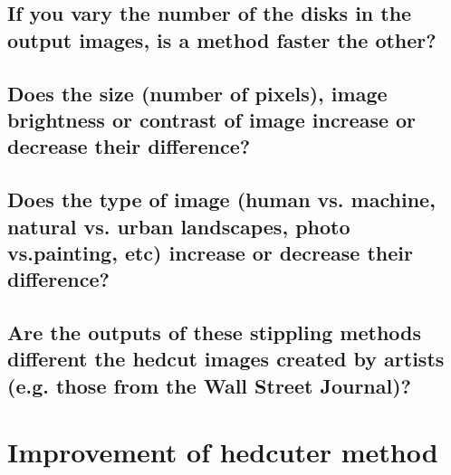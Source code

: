 \documentclass[11pt]{article}
\begin{document}
\subsection{If you vary the number of the disks in the output images, is a method faster the other?}
\subsection{Does the size (number of pixels), image brightness or contrast of image increase or decrease their difference?}
\subsection{Does the type of image (human vs. machine, natural vs. urban landscapes, photo vs.painting, etc) increase or decrease their difference?}
\subsection{Are the outputs of these stippling methods different the hedcut images created by artists (e.g. those from the Wall Street Journal)?}

\section{Improvement of hedcuter method}



\end{document}
